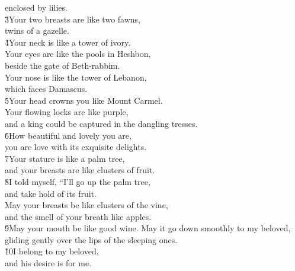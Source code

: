 \begin{poetry}
\poemll    enclosed by lilies. \\
\poeml \v{3}Your two breasts are like two fawns, \\
\poemll    twins of a gazelle. \\
\poeml \v{4}Your neck is like a tower of ivory. \\
\poemll    Your eyes are like the pools in Heshbon, \\
\poemlll       beside the gate of Beth-rabbim. \\
\poeml Your nose is like the tower of Lebanon, \\
\poemll    which faces Damascus. \\
\poeml \v{5}Your head crowns you like Mount Carmel. \\
\poemll    Your flowing locks are like purple, \\
\poemlll       and a king could be captured in the dangling tresses. \\
\poeml \v{6}How beautiful and lovely you are, \\
\poemll    you are love with its exquisite delights. \\
\poeml \v{7}Your stature is like a palm tree, \\
\poemll    and your breasts are like clusters of fruit. \\
\poeml \v{8}I told myself, ``I'll go up the palm tree, \\
\poemll    and take hold of its fruit. \\
\poeml May your breasts be like clusters of the vine, \\
\poemll    and the smell of your breath like apples. \\
\poeml \v{9}May your mouth be like good wine.
\poeml May it go down smoothly to my beloved, \\
\poemll    gliding gently over the lips of the sleeping ones. \\
\poeml \v{10}I belong to my beloved, \\
\poemll    and his desire is for me. \\

\end{poetry}
